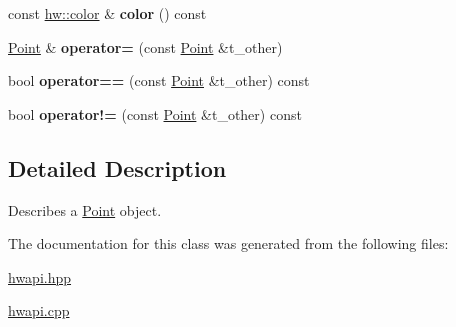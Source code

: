 \begin{DoxyCompactItemize}
const \mbox{\hyperlink{structhw_1_1color}{hw\+::color}} \& {\bfseries color} () const
\item 
\mbox{\label{classdummy__api_1_1Point_a231633791622a3c6a2ef54dcb7eed53e}} 
\mbox{\hyperlink{classdummy__api_1_1Point}{Point}} \& {\bfseries operator=} (const \mbox{\hyperlink{classdummy__api_1_1Point}{Point}} \&t\+\_\+other)
\item 
\mbox{\label{classdummy__api_1_1Point_a08b39577676ace969ab527f417f31794}} 
bool {\bfseries operator==} (const \mbox{\hyperlink{classdummy__api_1_1Point}{Point}} \&t\+\_\+other) const
\item 
\mbox{\label{classdummy__api_1_1Point_a010196ce0b7c4a08c3e832d229a3c2fa}} 
bool {\bfseries operator!=} (const \mbox{\hyperlink{classdummy__api_1_1Point}{Point}} \&t\+\_\+other) const
\end{DoxyCompactItemize}


\subsection{Detailed Description}
Describes a \mbox{\hyperlink{classdummy__api_1_1Point}{Point}} object. 

The documentation for this class was generated from the following files\+:\begin{DoxyCompactItemize}
\item 
\mbox{\hyperlink{hwapi_8hpp}{hwapi.\+hpp}}\item 
\mbox{\hyperlink{hwapi_8cpp}{hwapi.\+cpp}}\end{DoxyCompactItemize}
